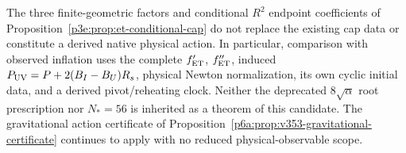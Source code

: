 \documentclass[12pt,a4paper]{article}
\begin{document}
\begin{remark}
\label{p6a:rem:et-candidate-observable-scope}
The three finite-geometric factors and conditional $R^2$ endpoint
coefficients of Proposition~\ref{p3e:prop:et-conditional-cap}
do not replace the existing cap data or constitute a derived native
physical action.  In particular, comparison with observed inflation
uses the complete $f_{\rm ET}'$, $f_{\rm ET}''$, induced
$P_{\rm UV}=P+2(B_I-B_U)R_s$, physical Newton normalization,
its own cyclic initial data, and a derived pivot/reheating clock.
Neither the deprecated $8\sqrt\alpha$ root prescription nor
$N_*=56$ is inherited as a theorem of this candidate.
The gravitational action certificate of
Proposition~\ref{p6a:prop:v353-gravitational-certificate}
continues to apply with no reduced physical-observable scope.
\end{remark}


\end{document}

